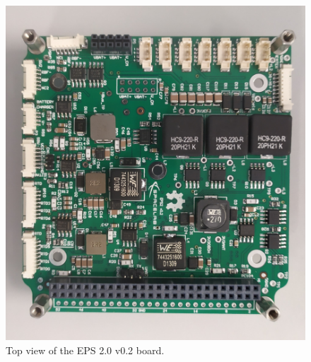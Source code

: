 \begin{figure}[!ht]
    \begin{center}
        \includegraphics[width=\columnwidth]{figures/v02/eps2-v02-top.jpg}
        \caption{Top view of the EPS 2.0 v0.2 board.}
        \label{fig:eps2-v01-top}
    \end{center}
\end{figure}

